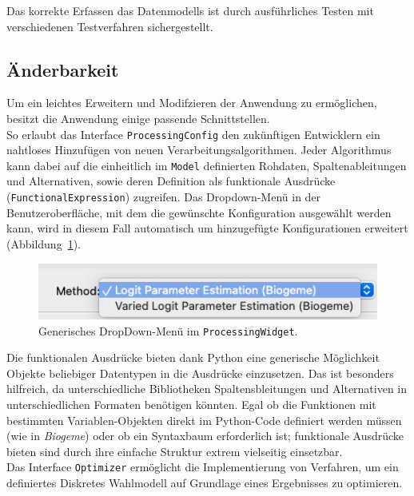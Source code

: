 \documentclass{article}
\newcommand{\classref}[1]{\texttt{#1}}
\begin{document}
Das korrekte Erfassen das Datenmodells ist durch ausführliches Testen mit verschiedenen Testverfahren sichergestellt.

\subsection{Änderbarkeit}

Um ein leichtes Erweitern und Modifzieren der Anwendung zu ermöglichen, besitzt die Anwendung einige passende Schnittstellen.\\

So erlaubt das Interface \classref{ProcessingConfig} den zukünftigen Entwicklern ein nahtloses Hinzufügen von neuen Verarbeitungsalgorithmen. Jeder Algorithmus kann dabei auf die einheitlich im \classref{Model} definierten Rohdaten, Spaltenableitungen und Alternativen, sowie deren Definition als funktionale Ausdrücke (\classref{FunctionalExpression}) zugreifen. Das Dropdown-Menü in der Benutzeroberfläche, mit dem die gewünschte Konfiguration ausgewählt werden kann, wird in diesem Fall automatisch um hinzugefügte Konfigurationen erweitert (Abbildung~\ref{gui:fig_processingwidget-dropdown}).\\

\begin{figure}[H]%
  \centering
  \includegraphics[width=12cm]{img/gui/processingwidget-dropdown.png}
  \caption{Generisches DropDown-Menü im \classref{ProcessingWidget}.}
  \label{gui:fig_processingwidget-dropdown}
\end{figure}

Die funktionalen Ausdrücke bieten dank Python eine generische Möglichkeit Objekte beliebiger Datentypen in die Ausdrücke einzusetzen. Das ist besonders hilfreich, da unterschiedliche Bibliotheken Spaltensbleitungen und Alternativen in unterschiedlichen Formaten benötigen könnten. Egal ob die Funktionen mit bestimmten Variablen-Objekten direkt im Python-Code definiert werden müssen (wie in \emph{Biogeme}) oder ob ein Syntaxbaum erforderlich ist; funktionale Ausdrücke bieten sind durch ihre einfache Struktur extrem vielseitig einsetzbar.\\

Das Interface \classref{Optimizer} ermöglicht die Implementierung von Verfahren, um ein definiertes Diskretes Wahlmodell auf Grundlage eines Ergebnisses zu optimieren.
\end{document}

